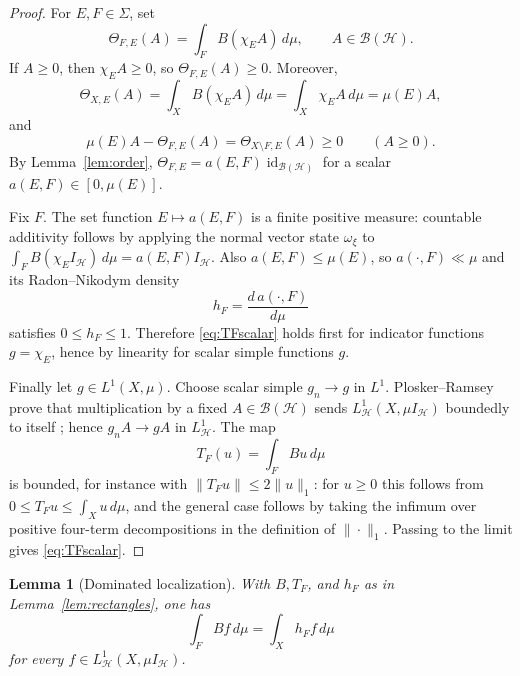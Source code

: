 \documentclass[11pt]{article}
\newtheorem{lemma}{Lemma}
\DeclareMathOperator{\id}{id}
\newcommand{\BH}{\mathcal B(\mathcal H)}
\newcommand{\HH}{\mathcal H}
\begin{document}
\begin{proof}
For \(E,F\in\Sigma\), set
\[
        \Theta_{F,E}(A)=\int_F B(\chi_E A)\,d\mu,\qquad A\in\BH .
\]
If \(A\geq0\), then \(\chi_EA\geq0\), so \(\Theta_{F,E}(A)\geq0\).  Moreover,
\[
        \Theta_{X,E}(A)
        =\int_X B(\chi_EA)\,d\mu
        =\int_X \chi_EA\,d\mu
        =\mu(E)A,
\]
and
\[
        \mu(E)A-\Theta_{F,E}(A)=\Theta_{X\setminus F,E}(A)\geq0
        \qquad(A\geq0).
\]
By Lemma~\ref{lem:order}, \(\Theta_{F,E}=a(E,F)\id_{\BH}\) for a scalar
\(a(E,F)\in[0,\mu(E)]\).

Fix \(F\).  The set function \(E\mapsto a(E,F)\) is a finite positive measure:
countable additivity follows by applying the normal vector state
\(\omega_\xi\) to
\(\int_F B(\chi_E I_{\HH})\,d\mu=a(E,F)I_{\HH}\).  Also
\(a(E,F)\leq\mu(E)\), so \(a(\cdot,F)\ll\mu\) and its Radon--Nikodym density
\[
        h_F=\frac{d\,a(\cdot,F)}{d\mu}
\]
satisfies \(0\leq h_F\leq1\).  Therefore \eqref{eq:TFscalar} holds first for
indicator functions \(g=\chi_E\), hence by linearity for scalar simple
functions \(g\).

Finally let \(g\in L^1(X,\mu)\).  Choose scalar simple \(g_n\to g\) in
\(L^1\).  Plosker--Ramsey prove that multiplication by a fixed
\(A\in\BH\) sends \(L^1_{\HH}(X,\mu I_{\HH})\) boundedly to itself
\cite[Proposition 4.3]{PR}; hence \(g_nA\to gA\) in \(L^1_{\HH}\).  The map
\[
        T_F(u)=\int_F Bu\,d\mu
\]
is bounded, for instance with \(\|T_Fu\|\leq2\|u\|_1\): for \(u\geq0\) this follows from
\(0\leq T_Fu\leq\int_Xu\,d\mu\), and the general case follows by taking the
infimum over positive four-term decompositions in the definition of
\(\|\cdot\|_1\).  Passing to the limit gives \eqref{eq:TFscalar}.
\end{proof}

\begin{lemma}[Dominated localization]\label{lem:localization}
With \(B,T_F\), and \(h_F\) as in Lemma~\ref{lem:rectangles}, one has
\[
        \int_F Bf\,d\mu=\int_X h_F f\,d\mu
        \tag{2}\label{eq:localization}
\]
for every \(f\in L^1_{\HH}(X,\mu I_{\HH})\).
\end{lemma}
\end{document}

